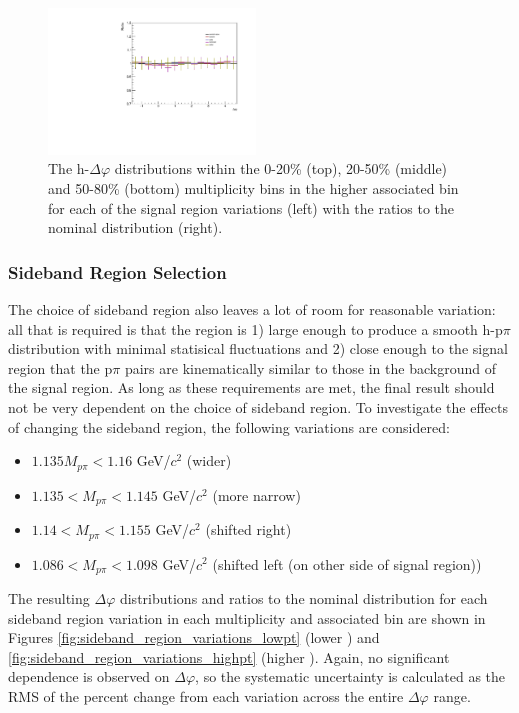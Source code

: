 \begin{figure}[ht]
    \includegraphics[width=0.49\textwidth]{figures/analysis/signal_variations_dphi_50_80_highpt_ratio.pdf}
    \caption{The h-\lmb $\Delta\varphi$ distributions within the 0-20\% (top), 20-50\% (middle) and 50-80\% (bottom) multiplicity bins in the higher associated \pt bin for each of the signal region variations (left) with the ratios to the nominal distribution (right).}
    \label{fig:signal_region_variations_highpt}
\end{figure}

\subsubsection{Sideband Region Selection}
The choice of sideband region also leaves a lot of room for reasonable variation: all that is required is that the region is 1) large enough to produce a smooth h-p$\pi$ distribution with minimal statisical fluctuations and 2) close enough to the signal region that the p$\pi$ pairs are kinematically similar to those in the background of the signal region. As long as these requirements are met, the final result should not be very dependent on the choice of sideband region. To investigate the effects of changing the sideband region, the following variations are considered:

\begin{itemize}
\item $1.135 M_{p\pi} < 1.16$ GeV/$c^2$ (wider)
\item $1.135 < M_{p\pi} < 1.145$ GeV/$c^2$ (more narrow)
\item $1.14 < M_{p\pi} < 1.155$ GeV/$c^2$ (shifted right)
\item $1.086 < M_{p\pi} < 1.098$ GeV/$c^2$ (shifted left (on other side of signal region))
\end{itemize}

The resulting $\Delta\varphi$ distributions and ratios to the nominal distribution for each sideband region variation in each multiplicity and associated \pt bin are shown in Figures \ref{fig:sideband_region_variations_lowpt} (lower \pt) and \ref{fig:sideband_region_variations_highpt} (higher \pt). Again, no significant dependence is observed on $\Delta\varphi$, so the systematic uncertainty is calculated as the RMS of the percent change from each variation across the entire $\Delta\varphi$ range.

